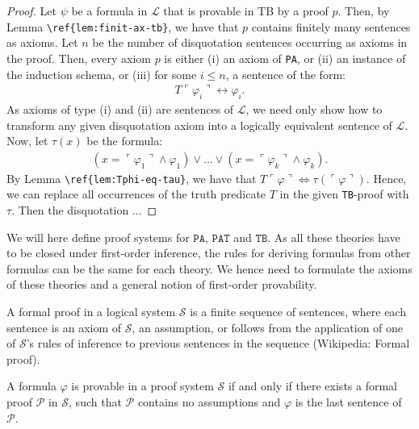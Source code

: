 \begin{proof}
Let $\psi$ be a formula in $\mathcal{L}$ that is provable in TB by a proof $p$. Then, by Lemma \verb|\ref{lem:finit-ax-tb}|, we have that $p$ contains finitely many sentences as axioms. Let $n$ be the number of disquotation sentences occurring as axioms in the proof. Then, every axiom $p$ is either (i) an axiom of \texttt{PA}, or (ii) an instance of the induction schema, or (iii) for some $i \leq n$, a sentence of the form: 
\begin{align*}
    T\ulcorner \varphi_i \urcorner \leftrightarrow \varphi_i.
\end{align*}
As axioms of type (i) and (ii) are sentences of $\mathcal{L}$, we need only show how to transform any given disquotation axiom into a logically equivalent sentence of $\mathcal{L}$. Now, let $\tau(x)$ be the formula: 
\begin{align*}
    (x = \ulcorner \varphi_1 \urcorner \land \varphi_1) \lor ... \lor (x = \ulcorner \varphi_k \urcorner \land \varphi_k).
\end{align*}
By Lemma \verb|\ref{lem:Tphi-eq-tau}|, we have that $T\ulcorner \varphi \urcorner \iff \tau(\ulcorner \varphi \urcorner)$. Hence, we can replace all occurrences of the truth predicate $T$ in the given \texttt{TB}-proof with $\tau$. Then the disquotation ...
\end{proof}

We will here define proof systems for $\texttt{PA}$, $\texttt{PAT}$ and $\texttt{TB}$. As all these theories have to be closed under first-order inference, the rules for deriving formulas from other formulas can be the same for each theory. We hence need to formulate the axioms of these theories and a general notion of first-order provability. 

\begin{definition}
    A formal proof in a logical system $\mathcal{S}$ is a finite sequence of sentences, where each sentence is an axiom of $\mathcal{S}$, an assumption, or follows from the application of one of $\mathcal{S}$'s rules of inference to previous sentences in the sequence (Wikipedia: Formal proof).
\end{definition}

\begin{definition}[provability]
    A formula $\varphi$ is provable in a proof system $\mathcal{S}$ if and only if there exists a formal proof $\mathcal{P}$ in $\mathcal{S}$, such that $\mathcal{P}$ contains no assumptions and $\varphi$ is the last sentence of $\mathcal{P}$.
\end{definition}


